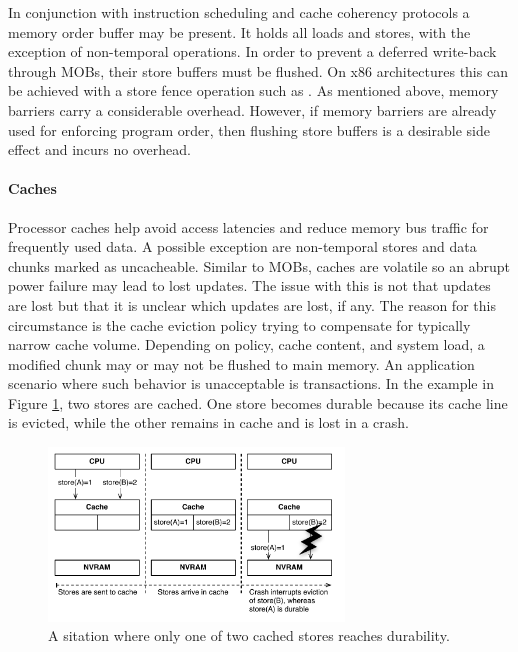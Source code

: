 In conjunction with instruction scheduling and cache coherency protocols a
memory order buffer may be present. It holds all loads and stores, with the
exception of non-temporal operations. In order to prevent a deferred write-back
through \acp{MOB}, their store buffers must be flushed. On x86
architectures this can be achieved with a store fence operation such as
. As mentioned above, memory barriers carry a considerable
overhead. However, if memory barriers are already used for enforcing program
order, then flushing store buffers is a desirable side effect and incurs no
overhead.

\paragraph{Caches}

Processor caches help avoid access latencies and reduce memory bus traffic for
frequently used data. A possible exception are non-temporal stores and data
chunks marked as uncacheable. Similar to \acp{MOB}, caches are
volatile so an abrupt power failure may lead to lost updates. The issue with
this is not that updates are lost but that it is unclear which updates are lost,
if any. The reason for this circumstance is the cache eviction policy trying to
compensate for typically narrow cache volume. Depending on policy, cache
content, and system load, a modified chunk may or may not be flushed to main
memory. An application scenario where such behavior is unacceptable is
transactions. In the example in Figure \ref{fig:nvram-cache-crash}, two stores are cached. One store becomes durable because its cache line is evicted, while the other remains in cache and is lost in a crash.



\begin{figure}[!ht]
    \centering
    \includegraphics[width=0.70\textwidth]{figures/nvram/cache-crash.pdf}
    \caption{A sitation where only one of two cached stores reaches durability.}
    \label{fig:nvram-cache-crash}
\end{figure}


